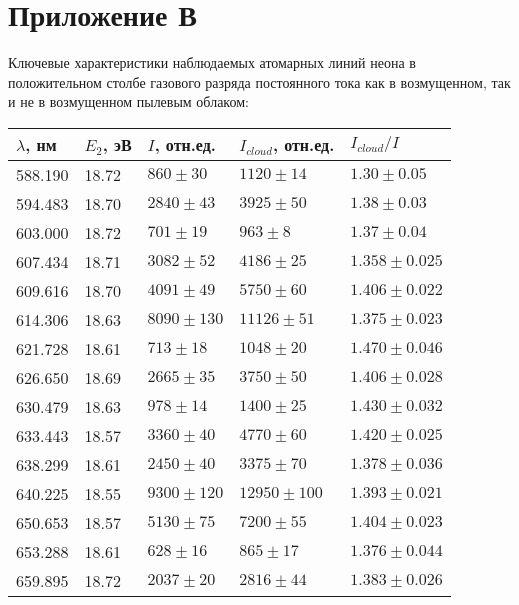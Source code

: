 \chapter{Приложение В}
\label{app:app1}
Ключевые характеристики наблюдаемых атомарных линий неона в положительном столбе газового разряда постоянного тока
как в возмущенном, так и не в возмущенном пылевым облаком:\\[5mm]

\begin{tabular}{|l|l|l|l|l|}
\hline
$\lambda$, нм & $E_2$, эВ & $I$, отн.ед.      & $I_{cloud}$, отн.ед. &  $I_{cloud} / I$              \\
\hline
588.190       & 18.72     & $ 860 \pm 30   $  & $1120 \pm 14   $     &  $1.30 \pm 0.05  $ \\
594.483       & 18.70     & $ 2840 \pm 43  $  & $3925 \pm 50   $     &  $1.38 \pm 0.03  $ \\
603.000       & 18.72     & $ 701 \pm 19   $  & $963 \pm 8     $     &  $1.37 \pm 0.04  $ \\
607.434       & 18.71     & $ 3082 \pm 52  $  & $4186 \pm 25   $     &  $1.358 \pm 0.025$ \\
609.616       & 18.70     & $ 4091 \pm 49  $  & $5750 \pm 60   $     &  $1.406 \pm 0.022$ \\
614.306       & 18.63     & $ 8090 \pm 130 $  & $11126 \pm 51  $     &  $1.375 \pm 0.023$ \\
621.728       & 18.61     & $ 713 \pm 18   $  & $1048 \pm 20   $     &  $1.470 \pm 0.046$ \\
626.650       & 18.69     & $ 2665 \pm 35  $  & $3750 \pm 50   $     &  $1.406 \pm 0.028$ \\
630.479       & 18.63     & $ 978 \pm 14   $  & $1400 \pm 25   $     &  $1.430 \pm 0.032$ \\
633.443       & 18.57     & $ 3360 \pm 40  $  & $4770 \pm 60   $     &  $1.420 \pm 0.025$ \\
638.299       & 18.61     & $ 2450 \pm 40  $  & $3375 \pm 70   $     &  $1.378 \pm 0.036$ \\
640.225       & 18.55     & $ 9300 \pm 120 $  & $12950 \pm 100 $     &  $1.393 \pm 0.021$ \\
650.653       & 18.57     & $ 5130 \pm 75  $  & $7200 \pm 55   $     &  $1.404 \pm 0.023$ \\
653.288       & 18.61     & $ 628 \pm 16   $  & $865 \pm 17    $     &  $1.376 \pm 0.044$ \\
659.895       & 18.72     & $ 2037 \pm 20  $  & $2816 \pm 44   $     &  $1.383 \pm 0.026$ \\

\end{tabular}
